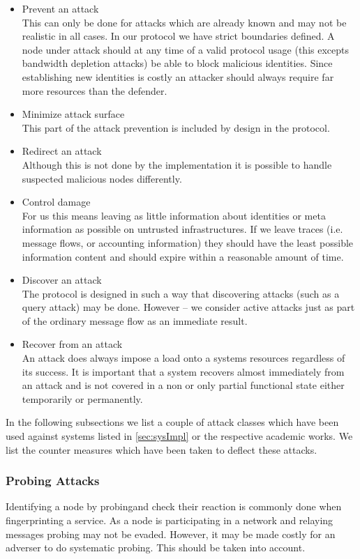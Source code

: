 \begin{itemize}
\item Prevent an attack\\
      This can only be done for attacks which are already known and may not be realistic in all cases. In our protocol we have strict boundaries defined. A node under attack should at any time of a valid protocol usage (this excepts bandwidth depletion attacks) be able to block malicious identities. Since establishing new identities is costly an attacker should always require far more resources than the defender.
\item Minimize attack surface\\
      This part of the attack prevention is included by design in the protocol.
\item Redirect an attack\\
	  Although this is not done by the implementation it is possible to handle suspected malicious nodes differently.
\item Control damage\\
      For us this means leaving as little information about identities or meta information as possible on untrusted infrastructures. If we leave traces (i.e. message flows, or accounting information) they should have the least possible information content and should expire within a reasonable amount of time.
\item Discover an attack\\
      The protocol is designed in such a way that discovering attacks (such as a query attack) may be done. However -- we consider active attacks just as part of the ordinary message flow as an immediate result. 
\item Recover from an attack\\
      An attack does always impose a load onto a systems resources regardless of its success. It is important that a system recovers almost immediately from an attack and is not covered in a non or only partial functional state either temporarily or permanently.
\end{itemize}

In the following subsections we list a couple of attack classes which have been used against systems listed in \ref{sec:sysImpl} or the respective academic works. We list the counter measures which have been taken to deflect these attacks.

\subsubsection{Probing Attacks}
Identifying a node by probingand check their reaction is commonly done when fingerprinting a service. As a node is participating in a network and relaying messages probing may not be evaded. However, it may be made costly for an adverser to do systematic probing. This should be taken into account. 

